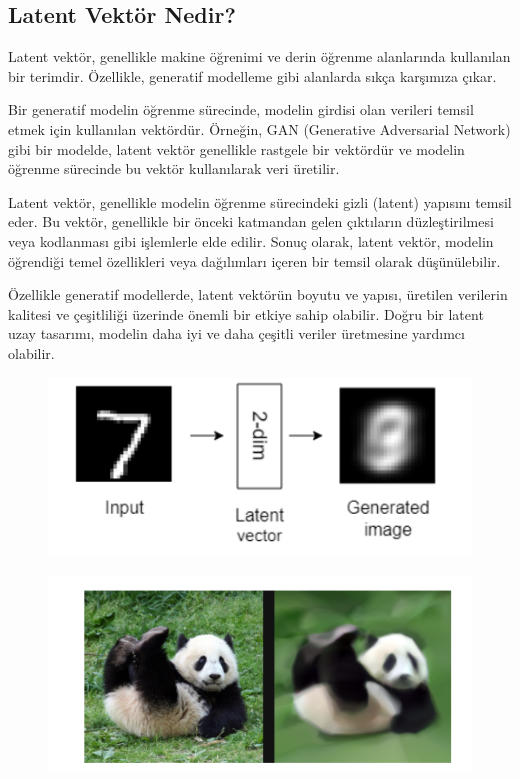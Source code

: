 \documentclass[12pt]{article}
\begin{document}
\subsection{Latent Vektör Nedir?}
Latent vektör, genellikle makine öğrenimi ve derin öğrenme alanlarında kullanılan bir terimdir. Özellikle, generatif modelleme gibi alanlarda sıkça karşımıza çıkar.

Bir generatif modelin öğrenme sürecinde, modelin girdisi olan verileri temsil etmek için kullanılan vektördür. Örneğin, GAN (Generative Adversarial Network) gibi bir modelde, latent vektör genellikle rastgele bir vektördür ve modelin öğrenme sürecinde bu vektör kullanılarak veri üretilir.

Latent vektör, genellikle modelin öğrenme sürecindeki gizli (latent) yapısını temsil eder. Bu vektör, genellikle bir önceki katmandan gelen çıktıların düzleştirilmesi veya kodlanması gibi işlemlerle elde edilir. Sonuç olarak, latent vektör, modelin öğrendiği temel özellikleri veya dağılımları içeren bir temsil olarak düşünülebilir.

Özellikle generatif modellerde, latent vektörün boyutu ve yapısı, üretilen verilerin kalitesi ve çeşitliliği üzerinde önemli bir etkiye sahip olabilir. Doğru bir latent uzay tasarımı, modelin daha iyi ve daha çeşitli veriler üretmesine yardımcı olabilir.
\begin{figure}[h]
    \centering
    \begin{minipage}{0.60\textwidth}
        \centering
        \includegraphics[width=\textwidth]{latent1.png} 
        \label{fig:resim1}
    \end{minipage}\hfill
    \begin{minipage}{0.60\textwidth}
        \centering
        \includegraphics[width=\textwidth]{latent2.png}
        \label{fig:resim2}
    \end{minipage}
\end{figure}
\end{document}
